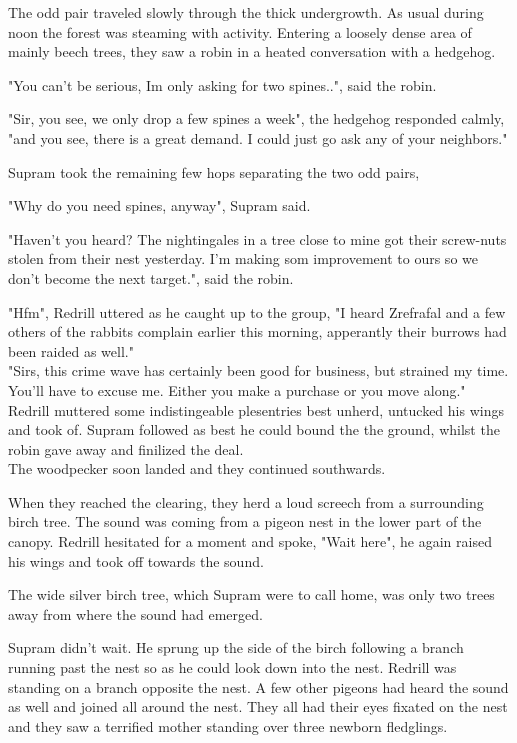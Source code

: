 \documentclass[smalldemyvopaper,11pt,twoside,onecolumn,openright,extrafontsizes]{memoir}
\newlength\drop
\begin{document}
The odd pair traveled slowly through the thick undergrowth. As usual during noon the forest was steaming with activity.
Entering a loosely dense area of mainly beech trees, they saw a robin in a heated conversation with a hedgehog.

"You can't be serious, Im only asking for two spines..", said the robin.

"Sir, you see, we only drop a few spines a week", the hedgehog responded calmly, "and you see, there is a great demand. I could just go ask any of your neighbors."

Supram took the remaining few hops separating the two odd pairs,

"Why do you need spines, anyway", Supram said.

"Haven't you heard? The nightingales in a tree close to mine got their screw-nuts stolen from their nest yesterday. I'm making
som improvement to ours so we don't become the next target.", said the robin.

"Hfm", Redrill uttered as he caught up to the group, "I heard Zrefrafal and a few others of the rabbits complain earlier this morning, apperantly their burrows had been raided as well."\\

"Sirs, this crime wave has certainly been good for business, but strained my time. You'll have to excuse me. Either you make a purchase or you move along."\\

Redrill muttered some indistingeable plesentries best unherd, untucked his wings and took of. Supram followed as best he could bound the the ground, whilst the robin gave away and finilized the deal.\\

The woodpecker soon landed and they continued southwards. 

When they reached the clearing, they herd a loud screech from a surrounding birch tree. The sound was coming from a pigeon nest in the lower part of the canopy. Redrill hesitated for a moment and spoke, "Wait here", he again raised his wings and took off towards the sound. 

The wide silver birch tree, which Supram were to call home, was only two trees away from where the sound had emerged.

Supram didn't wait. He sprung up the side of the birch following a branch running past the nest so as he could look down into the nest. Redrill was standing on a branch opposite the nest. A few other pigeons had heard the sound as well and joined all around the nest. They all had their eyes fixated on the nest and they saw a terrified mother standing over three newborn fledglings.\\
\end{document}
